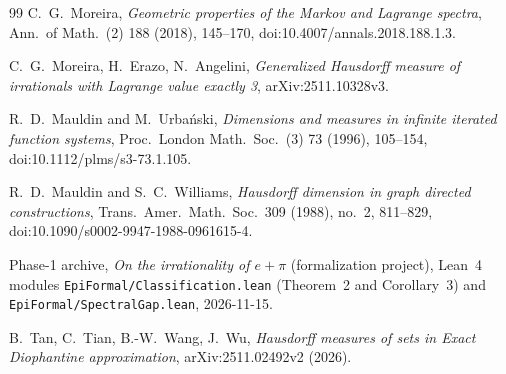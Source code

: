 \begin{thebibliography}{99}
 C.~G.~Moreira, \emph{Geometric properties of the Markov and
Lagrange spectra}, Ann.\ of Math.\ (2) 188 (2018), 145--170,
doi:10.4007/annals.2018.188.1.3.

 C.~G.~Moreira, H.~Erazo, N.~Angelini,
\emph{Generalized Hausdorff measure of irrationals with Lagrange value exactly 3},
arXiv:2511.10328v3.

{\sloppy
{} R.~D.~Mauldin and M.~Urba\'nski, \emph{Dimensions and measures in
infinite iterated function systems}, Proc.\ London Math.\ Soc.\ (3) 73 (1996),
105--154, doi:10.1112/plms/s3-73.1.105.
}

{\sloppy
{} R.~D.~Mauldin and S.~C.~Williams,
\emph{Hausdorff dimension in graph directed constructions},
Trans.~Amer.~Math.~Soc.~309 (1988), no.~2, 811--829, doi:10.1090/s0002-9947-1988-0961615-4.
}

 Phase-1 archive, \emph{On the irrationality of $e+\pi$}
(formalization project), Lean~4 modules \texttt{EpiFormal/\allowbreak Classification.lean}
(Theorem~2 and Corollary~3) and \texttt{EpiFormal/\allowbreak Spectral\allowbreak Gap.lean}, 2026-11-15.

 B.~Tan, C.~Tian, B.-W.~Wang, J.~Wu, \emph{Hausdorff measures of
sets in Exact Diophantine approximation}, arXiv:2511.02492v2 (2026).
\end{thebibliography}
